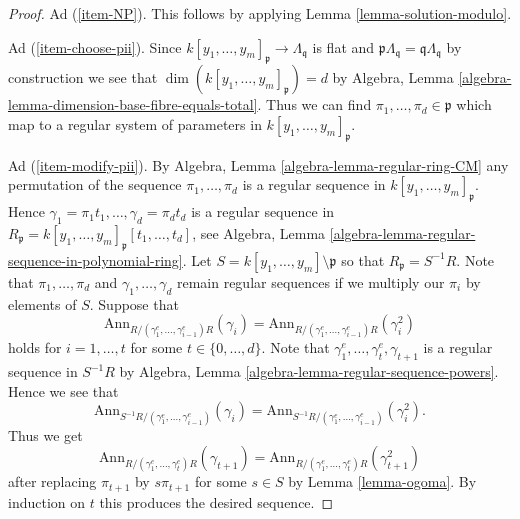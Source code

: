 \begin{proof}
\medskip\noindent
Ad (\ref{item-NP}). This follows by applying Lemma \ref{lemma-solution-modulo}.

\medskip\noindent
Ad (\ref{item-choose-pii}). Since
$k[y_1, \ldots, y_m]_\mathfrak p \to \Lambda_\mathfrak q$ is
flat and $\mathfrak p \Lambda_\mathfrak q = \mathfrak q \Lambda_\mathfrak q$
by construction
we see that $\dim(k[y_1, \ldots, y_m]_\mathfrak p) = d$ by
Algebra, Lemma \ref{algebra-lemma-dimension-base-fibre-equals-total}.
Thus we can find $\pi_1, \ldots, \pi_d \in \mathfrak p$ which map to
a regular system of parameters in $k[y_1, \ldots, y_m]_\mathfrak p$.

\medskip\noindent
Ad (\ref{item-modify-pii}). By
Algebra, Lemma \ref{algebra-lemma-regular-ring-CM}
any permutation of the sequence $\pi_1, \ldots, \pi_d$ is a
regular sequence in $k[y_1, \ldots, y_m]_\mathfrak p$. Hence
$\gamma_1 = \pi_1 t_1, \ldots, \gamma_d = \pi_d t_d$ is a regular
sequence in
$R_\mathfrak p = k[y_1, \ldots, y_m]_\mathfrak p[t_1, \ldots, t_d]$, see
Algebra, Lemma \ref{algebra-lemma-regular-sequence-in-polynomial-ring}.
Let $S = k[y_1, \ldots, y_m] \setminus \mathfrak p$ so that
$R_\mathfrak p = S^{-1}R$. Note that $\pi_1, \ldots, \pi_d$
and $\gamma_1, \ldots, \gamma_d$
remain regular sequences if we multiply our $\pi_i$ by elements of $S$.
Suppose that
$$
\text{Ann}_{R/(\gamma_1^e, \ldots, \gamma_{i - 1}^e)R}(\gamma_i)
=
\text{Ann}_{R/(\gamma_1^e, \ldots, \gamma_{i - 1}^e)R}(\gamma_i^2)
$$
holds for $i = 1, \ldots, t$ for some $t \in \{0, \ldots, d\}$. Note that
$\gamma_1^e, \ldots, \gamma_t^e, \gamma_{t + 1}$ is a
regular sequence in $S^{-1}R$ by
Algebra, Lemma \ref{algebra-lemma-regular-sequence-powers}.
Hence we see that
$$
\text{Ann}_{S^{-1}R/(\gamma_1^e, \ldots, \gamma_{i - 1}^e)}(\gamma_i) =
\text{Ann}_{S^{-1}R/(\gamma_1^e, \ldots, \gamma_{i - 1}^e)}(\gamma_i^2).
$$
Thus we get
$$
\text{Ann}_{R/(\gamma_1^e, \ldots, \gamma_t^e)R}(\gamma_{t + 1})
=
\text{Ann}_{R/(\gamma_1^e, \ldots, \gamma_t^e)R}(\gamma_{t + 1}^2)
$$
after replacing $\pi_{t + 1}$ by $s\pi_{t + 1}$ for some $s \in S$ by
Lemma \ref{lemma-ogoma}. By induction on $t$ this produces the desired
sequence.


\end{proof}
